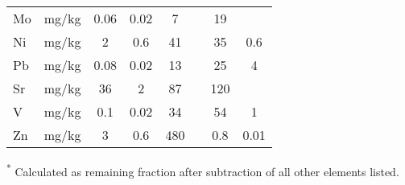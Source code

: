 \begin{table}[ht!]
{\begin{threeparttable}
\begin{tabular}{lccccccc}
Mo & mg/kg & 0.06 & 0.02 & 7 &  & 19 &  \\
Ni & mg/kg & 2 & 0.6 & 41 &  & 35 & 0.6 \\
Pb & mg/kg & 0.08 & 0.02 & 13 &  & 25 & 4 \\
Sr & mg/kg & 36 & 2 & 87 &  & 120 &  \\
V & mg/kg & 0.1 & 0.02 & 34 &  & 54 & 1 \\
Zn & mg/kg & 3 & 0.6 & 480 &  & 0.8 & 0.01\\ \bottomrule   
\end{tabular}
\begin{tablenotes}
\item \textsuperscript{*} Calculated as remaining fraction after subtraction of all other elements listed.
\end{tablenotes}
\end{threeparttable}}
\end{table}

